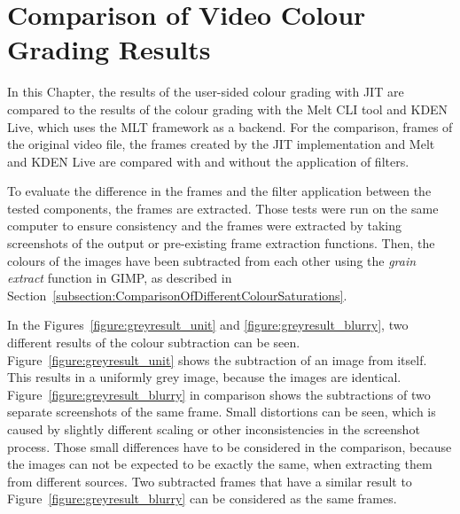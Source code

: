 \documentclass[../MasterThesis.tex]{subfiles}
\begin{document}
	
	
%
%
%
%
%
%
%
%
\newpage
\section{Comparison of Video Colour Grading Results} \label{section:experimentalevaluationanddiscussion}  


In this Chapter, the results of the user-sided colour grading with JIT are compared to the results of the colour grading with the Melt CLI tool and KDEN Live, which uses the MLT framework as a backend. For the comparison, frames of the original video file, the frames created by the JIT implementation and Melt and KDEN Live are compared with and without the application of filters.


To evaluate the difference in the frames and the filter application between the tested components, the frames are extracted. Those tests were run on the same computer to ensure consistency and the frames were extracted by taking screenshots of the output or pre-existing frame extraction functions.
Then, the colours of the images have been subtracted from each other using the \textit{grain extract} function in GIMP, as described in Section~\ref{subsection:ComparisonOfDifferentColourSaturations}.


In the Figures~\ref{figure:greyresult_unit} and \ref{figure:greyresult_blurry}, two different results of the colour subtraction can be seen. 
%
Figure~\ref{figure:greyresult_unit} shows the subtraction of an image from itself. This results in a uniformly grey image, because the images are identical. Figure~\ref{figure:greyresult_blurry} in comparison shows the subtractions of two separate screenshots of the same frame. Small distortions can be seen, which is caused by slightly different scaling or other inconsistencies in the screenshot process. Those small differences have to be considered in the comparison, because the images can not be expected to be exactly the same, when extracting them from different sources. Two subtracted frames that have a similar result to Figure~\ref{figure:greyresult_blurry} can be considered as the same frames.
\end{document}
